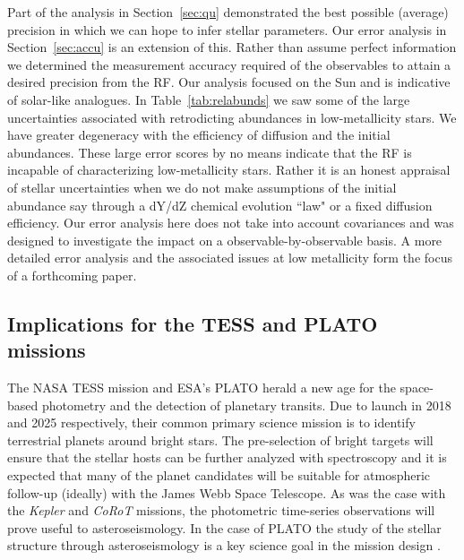 Part of the analysis in Section~\ref{sec:qu} demonstrated the best possible (average) precision in which we can hope to infer stellar parameters. Our error analysis in Section~\ref{sec:accu} is an extension of this. Rather than assume perfect information we determined  
 the measurement accuracy required of the observables to attain a desired precision from the RF.
Our analysis focused on the Sun and is indicative of solar-like analogues.
In Table~\ref{tab:relabunds} we saw some of the large uncertainties associated with retrodicting abundances in low-metallicity stars. We have greater degeneracy with the efficiency of diffusion and the initial abundances. These large error scores by no means indicate that the RF is incapable of characterizing low-metallicity stars. Rather it is an honest appraisal of stellar uncertainties when we do not make assumptions of the initial abundance say through a dY/dZ  chemical evolution ``law"  or a fixed diffusion efficiency. Our error analysis here does not take into account covariances and was designed to investigate the impact on a observable-by-observable basis.
A more detailed error analysis and the associated issues at low metallicity form the focus of a forthcoming paper.  


\subsection{Implications for the TESS and PLATO missions}

The NASA TESS mission \citep{2015JATIS...1a4003R} and ESA's PLATO \citep{2014ExA....38..249R} herald a new age for the space-based photometry and the detection of planetary transits. Due to launch in 2018 and 2025 respectively, their common primary science mission is to identify terrestrial planets around bright stars. The pre-selection of bright targets will ensure that the stellar hosts can be further analyzed with spectroscopy and it is expected that many of the planet candidates will be suitable for atmospheric follow-up (ideally) with the James Webb Space Telescope. As was the case with the \emph{Kepler} and \emph{CoRoT} missions, the photometric time-series observations will prove useful to asteroseismology. In the case of PLATO the study of the stellar structure through asteroseismology is a key science goal in the mission design \citep{2014ExA....38..249R}.  


